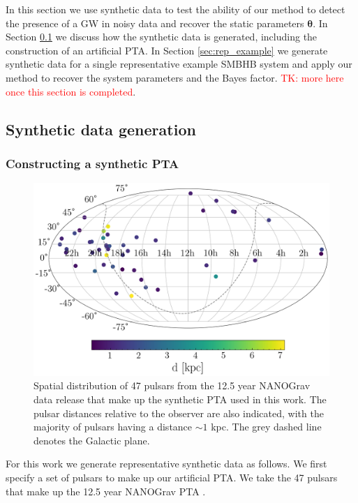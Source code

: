\documentclass[fleqn,usenatbib,useAMS]{mnras}
\begin{document}
In this section we use synthetic data to test the ability of our method to detect the presence of a GW in noisy data and recover the static parameters $\boldsymbol{\theta}$. In Section \ref{sec:synth_data} we discuss how the synthetic data is generated, including the construction of an artificial PTA. In Section \ref{sec:rep_example} we generate synthetic data for a single representative example SMBHB system and apply our method to recover the system parameters and the Bayes factor. \textcolor{red}{TK: more here once this section is completed}.


\subsection{Synthetic data generation} \label{sec:synth_data}

\subsubsection{Constructing a synthetic PTA}\label{sec:synt_pta}

\begin{figure}
	\includegraphics[width=\columnwidth]{images/pulsar_distribution}
	\caption{Spatial distribution of 47 pulsars from the 12.5 year NANOGrav data release that make up the synthetic PTA used in this work. The pulsar distances relative to the observer are also indicated, with the majority of pulsars having a distance $\sim 1$ kpc. The grey dashed line denotes the Galactic plane.}
	\label{fig:pulsar_distrib}
\end{figure}

For this work we generate representative synthetic data as follows. We first specify a set of pulsars to make up our artificial PTA. We take the 47 pulsars that make up the 12.5 year NANOGrav PTA \citep{2020ApJ...905L..34A}. 
\end{document}
